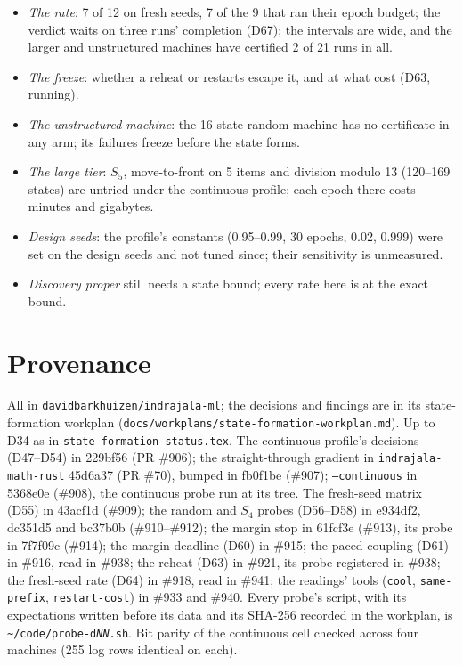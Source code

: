\documentclass[11pt]{article}
\begin{document}
\begin{itemize}
  \item \emph{The rate}: 7 of 12 on fresh seeds, 7 of the 9 that ran their epoch budget; the verdict
  waits on three runs' completion (D67); the intervals are wide, and the larger and unstructured machines have certified 2 of 21 runs in all.
  \item \emph{The freeze}: whether a reheat or restarts escape it, and at what cost (D63, running).
  \item \emph{The unstructured machine}: the 16-state random machine has no certificate in any arm;
  its failures freeze before the state forms.
  \item \emph{The large tier}: $S_5$, move-to-front on 5 items and division modulo 13 (120--169
  states) are untried under the continuous profile; each epoch there costs minutes and gigabytes.
  \item \emph{Design seeds}: the profile's constants (0.95--0.99, 30 epochs, 0.02, 0.999) were set
  on the design seeds and not tuned since; their sensitivity is unmeasured.
  \item \emph{Discovery proper} still needs a state bound; every rate here is at the exact bound.
\end{itemize}

\section{Provenance}
\label{sec:provenance}

All in \texttt{davidbarkhuizen/indrajala-ml}; the decisions and findings are in its
state-formation workplan (\texttt{docs/workplans/state-formation-workplan.md}). Up to D34 as in \texttt{state-formation-status.tex}. The
continuous profile's decisions (D47--D54) in 229bf56 (PR \#906); the straight-through gradient in
\texttt{indrajala-math-rust} 45d6a37 (PR \#70), bumped in fb0f1be (\#907); \texttt{--continuous} in
5368e0e (\#908), the continuous probe run at its tree. The fresh-seed matrix (D55) in 43acf1d (\#909);
the random and $S_4$ probes (D56--D58) in e934df2, dc351d5 and bc37b0b (\#910--\#912); the margin
stop in 61fcf3e (\#913), its probe in 7f7f09c (\#914); the margin deadline (D60) in \#915; the paced
coupling (D61) in \#916, read in \#938; the reheat (D63) in \#921, its probe registered in \#938; the
fresh-seed rate (D64) in \#918, read in \#941; the readings' tools (\texttt{cool},
\texttt{same-prefix}, \texttt{restart-cost}) in \#933 and \#940. Every probe's script, with its expectations
written before its data and its SHA-256 recorded in the workplan, is \texttt{\textasciitilde/code/probe-d\textit{NN}.sh}.
Bit parity of the continuous cell checked across four machines (255 log rows identical on each).



\end{document}
